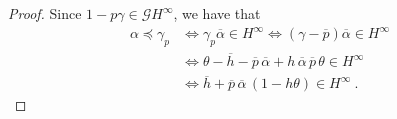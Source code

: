\documentclass[10pt,a4paper]{amsart}
\newcommand{\GG}{\ensuremath{\mathcal{G}}}
\newcommand{\Hinf}{\ensuremath{H^\infty}}
\newcommand{\ol}[1]{\ensuremath{\overline{#1}}}
\begin{document}
\begin{proof}
Since $1-p\gamma \in\GG\Hinf$, we have that
\begin{align}
\alpha \preceq \gamma_p
	& \iff 
	\gamma_p \ol\alpha \in\Hinf	 \iff (\gamma - \ol p) \ol\alpha \in\Hinf\\
& \iff 
	\theta - \ol h - \ol p\, \ol\alpha + h\,\ol\alpha\, \ol p\, \theta \in\Hinf \\
& \iff 
	\ol h + \ol p\, \ol\alpha \, (1 - h\theta) \in \Hinf \ .
\end{align}
\end{proof}
\end{document}
